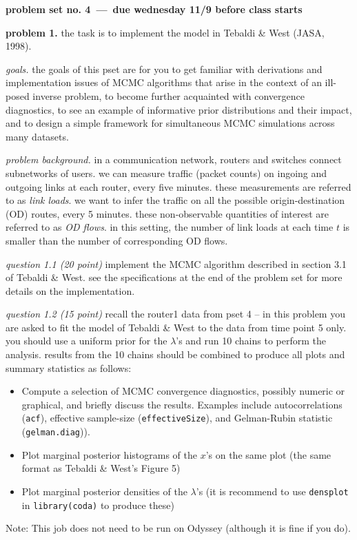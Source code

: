 \documentclass[11pt]{article}
\begin{document}
\centerline{\textbf{problem set no. 4~---~due wednesday 11/9 before class starts}}
\textbf{problem 1.}
the task is to implement the model in Tebaldi \& West (JASA, 1998). 

{\em goals.} the goals of this pset are for you to get familiar with derivations and implementation issues of MCMC algorithms that arise in the context of an ill-posed inverse problem, to become further acquainted with convergence diagnostics, to see an example of informative prior distributions and their impact, and to design a simple framework for simultaneous MCMC simulations across many datasets.


{\em problem background.} in a communication network, routers and switches connect subnetworks of users. we can measure traffic (packet counts) on ingoing and outgoing links at each router, every five minutes. these measurements are referred to as {\em link loads}. we want to infer the traffic on all the possible origin-destination (OD) routes, every 5 minutes. these non-observable quantities of interest are referred to as {\em OD  flows}. in this setting, the number of link loads at each time $t$ is smaller than the number of corresponding OD flows.


{\em question 1.1 (20 point)}
%
implement the MCMC algorithm described in section 3.1 of Tebaldi \& West. see the specifications at the end of the problem set for more details on the implementation.

{\em question 1.2 (15 point)} 
%
recall the router1 data from pset 4 -- in this problem you are asked to fit the model of Tebaldi \& West to the data from time point 5 only. you should use a uniform prior for the $\lambda$'s and run 10 chains to perform the analysis. results from the 10 chains should be combined to produce all plots and summary statistics as follows:
\begin{itemize}
\item Compute a selection of MCMC convergence diagnostics, possibly numeric or graphical, and briefly discuss the results. Examples include autocorrelations (\texttt{acf}), effective sample-size (\texttt{effectiveSize}), and Gelman-Rubin statistic (\texttt{gelman.diag})).
\item Plot marginal posterior histograms of the $x$'s on the same plot (the same format as Tebaldi \& West's Figure 5)
\item Plot marginal posterior densities of the $\lambda$'s (it is recommend to use \texttt{densplot} in \texttt{library(coda)} to produce these)
\end{itemize}
Note: This job does not need to be run on Odyssey (although it is fine if you do).  
\end{document}
